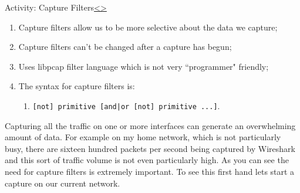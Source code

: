 \documentclass[12pt]{extarticle}
\newenvironment{instructionblock}{\Large\bgroup}{\egroup}
\newcommand{\ben}{\begin{enumerate}}
\newcommand{\een}{\end{enumerate}}
\begin{document}
	
	
	
	
	\pagebreak
	\begin{slide}{Activity: Capture Filters}{\hyperref[slide 26]{\textless}\hyperref[slide 28]{\textgreater}}
		\begin{instructionblock}
			\begin{enumerate}
				\item Capture filters allow us to be more selective about the data we capture;
				\item Capture filters can't be changed after a capture has begun;
				\item Uses libpcap filter language which is not very ``programmer" friendly\cite{capturefilters};
				\item The syntax for capture filters is:
				\ben
					\item \lstinline[basicstyle=\large]{[not] primitive [and|or [not] primitive ...]}\cite{capture_filtering}.
				\een
			\end{enumerate}
		\end{instructionblock}
	\end{slide}
	\vspace{4mm}
	
	\noindent
	Capturing all the traffic on one or more interfaces can generate an overwhelming amount of data. For example on my home network, which is not particularly busy, there are sixteen hundred packets per second being captured by Wireshark and this sort of traffic volume is not even particularly high. As you can see the need for capture filters is extremely important. To see this first hand lets start a capture on our current network.
	
\end{document}
